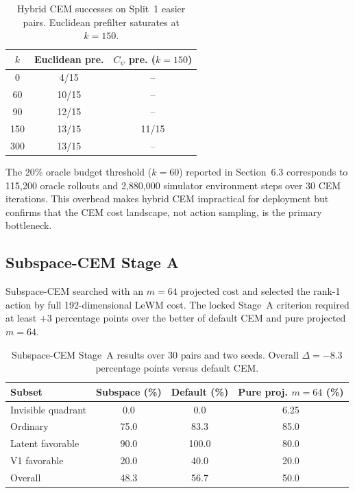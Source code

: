 \begin{table}[h]
\centering
\caption{Hybrid CEM successes on Split~1 easier pairs.  Euclidean prefilter
saturates at $k=150$.}
\label{tab:h-oracle-split1}
\small
\begin{tabular}{ccc}
\toprule
$k$ & Euclidean pre. & $C_\psi$ pre. ($k=150$) \\
\midrule
0 & 4/15 & -- \\
60 & 10/15 & -- \\
90 & 12/15 & -- \\
150 & 13/15 & 11/15 \\
300 & 13/15 & -- \\
\bottomrule
\end{tabular}
\end{table}

The 20\% oracle budget threshold ($k=60$) reported in Section~6.3
corresponds to 115{,}200 oracle rollouts and 2{,}880{,}000 simulator
environment steps over 30 CEM iterations.  This overhead makes hybrid CEM
impractical for deployment but confirms that the CEM cost landscape, not
action sampling, is the primary bottleneck.

\subsection{Subspace-CEM Stage A}
\label{app:negative_subspace}

Subspace-CEM searched with an $m=64$ projected cost and selected the rank-1
action by full 192-dimensional LeWM cost.  The locked Stage~A criterion
required at least +3 percentage points over the better of default CEM and
pure projected $m=64$.

\begin{table}[h]
\centering
\caption{Subspace-CEM Stage~A results over 30 pairs and two seeds.  Overall
$\Delta=-8.3$ percentage points versus default CEM.}
\label{tab:h-subspace}
\small
\begin{tabular}{lccc}
\toprule
Subset & Subspace (\%) & Default (\%) & Pure proj. $m{=}64$ (\%) \\
\midrule
Invisible quadrant & 0.0 & 0.0 & 6.25 \\
Ordinary & 75.0 & 83.3 & 85.0 \\
Latent favorable & 90.0 & 100.0 & 80.0 \\
V1 favorable & 20.0 & 40.0 & 20.0 \\
Overall & 48.3 & 56.7 & 50.0 \\
\bottomrule
\end{tabular}
\end{table}

